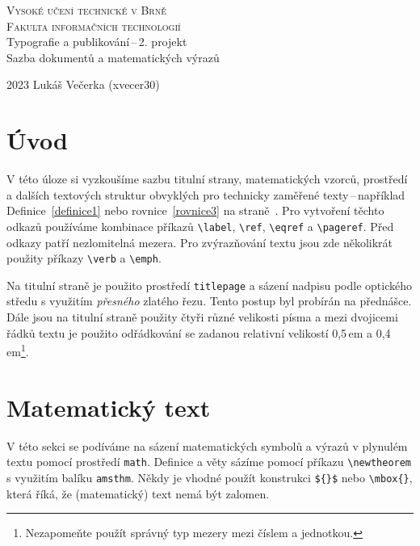 \documentclass[hidelinks, 11pt, a4paper, twocolumn]{article}
\theoremstyle{definition}
\theoremstyle{definition}
\begin{document}
\begin{titlepage}
    \begin{center}
        \textsc{\Huge Vysoké učení technické v Brně\\[0.5em]
        \huge Fakulta informačních technologií}\\
        {\LARGE Typografie a publikování\,--\,2. projekt\\[0.4em]
        Sazba dokumentů a matematických výrazů}\\
    \end{center}
        {\Large 2023 \hfill Lukáš Večerka (xvecer30)}
\end{titlepage}

\newpage

\section*{Úvod}
\label{strana1}
V této úloze si vyzkoušíme sazbu titulní strany, matematických vzorců,
 prostředí a dalších textových struktur obvyklých pro technicky zaměřené
  texty\,--\,například Definice~\ref{definice1} nebo rovnice~\eqref{rovnice3} na straně~\pageref{strana1}. Pro vytvoření těchto odkazů
   používáme kombinace příkazů \verb|\label|, \verb|\ref|, \verb|\eqref| a \verb|\pageref|.
    Před odkazy patří nezlomitelná mezera. Pro zvýrazňování textu jsou zde několikrát
     použity příkazy \verb|\verb| a \verb|\emph|.
  
Na titulní straně je použito prostředí \texttt{titlepage} a
      sázení nadpisu podle optického středu s využitím \emph{přesného} zlatého řezu. Tento
       postup byl probírán na přednášce. Dále jsou na titulní straně použity čtyři různé
        velikosti písma a mezi dvojicemi řádků textu je použito odřádkování se zadanou relativní
         velikostí 0,5\,em a 0,4\,em\footnote[1]{Nezapomeňte použít správný typ mezery mezi číslem a jednotkou.}.

\section{Matematický text}
V této sekci se podíváme na sázení matematických symbolů a výrazů v plynulém textu pomocí prostředí \texttt{math}.
 Definice a věty sázíme pomocí příkazu \verb|\newtheorem| s využitím balíku \texttt{amsthm}. Někdy je vhodné použít konstrukci
  \verb|${}$| nebo \verb|\mbox{}|, která říká, že (matematický) text nemá být zalomen.
\end{document}
